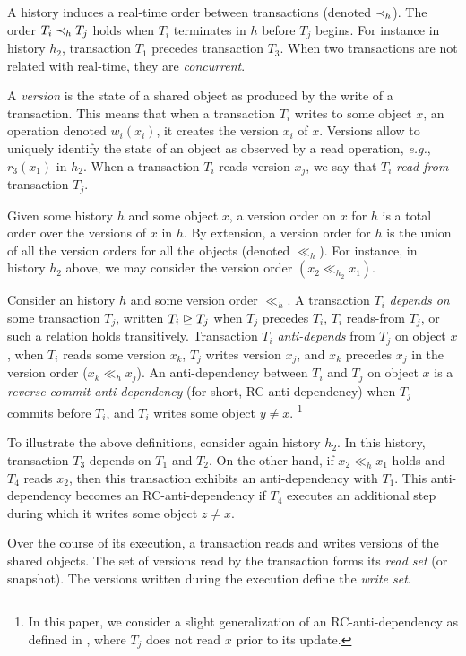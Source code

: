

A history induces a real-time order between transactions (denoted $\hb_h$).
The order $T_i \hb_h T_j$ holds when $T_i$ terminates in $h$ before $T_j$ begins.
For instance in history $h_2$, transaction $T_1$ precedes transaction $T_3$.
When two transactions are not related with real-time, they are \emph{concurrent}.

A \emph{version} is the state of a shared object as produced by the write of a transaction.
This means that when a transaction $T_i$ writes to some object $x$, an operation denoted $w_i(x_i)$, it creates the version $x_i$ of $x$.
Versions allow to uniquely identify the state of an object as observed by a read operation, \emph{e.g.}, $r_3(x_1)$ in $h_2$.
When a transaction $T_i$ reads version $x_j$, we say that $T_i$ \emph{read-from} transaction $T_j$.

Given some history $h$ and some object $x$, a version order on $x$ for $h$ is a total order over the versions of $x$ in $h$.
By extension, a version order for $h$ is the union of all the version orders for all the objects (denoted $\ll_h$).
For instance, in history $h_2$ above, we may consider the version order $(x_2 \ll_{h_2} x_1)$.

Consider an history $h$ and some version order $\ll_h$.
A transaction $T_i$ \emph{depends on} some transaction $T_j$, written $T_i \mathrel{\unrhd} T_j$ when $T_j$ precedes $T_i$, $T_i$ reads-from $T_j$, or such a relation holds transitively.
Transaction $T_i$ \emph{anti-depends} from $T_j$ on object $x$, when $T_i$ reads some version $x_k$, $T_j$ writes version $x_j$, and $x_k$ precedes $x_j$ in the version order ($x_k \ll_{h} x_j$).
An anti-dependency between $T_i$ and $T_j$ on object $x$ is a \emph{reverse-commit anti-dependency} (for short, RC-anti-dependency) \cite{hans16} when $T_j$ commits before $T_i$, and $T_i$ writes some object $y \neq x$.%
%
\footnote{
  In this paper, we consider a slight generalization of an RC-anti-dependency as defined in \cite{hans16}, where $T_j$ does not read $x$ prior to its update.
}

To illustrate the above definitions, consider again history $h_2$.
In this history, transaction $T_3$ depends on $T_1$ and $T_2$.
On the other hand, if $x_2 \ll_h x_1$ holds and $T_4$ reads $x_2$, then this transaction exhibits an anti-dependency with $T_1$.
This anti-dependency becomes an RC-anti-dependency if $T_4$ executes an additional step during which it writes some object $z \neq x$.

Over the course of its execution, a transaction reads and writes versions of the shared objects.
The set of versions read by the transaction forms its \emph{read set} (or snapshot).
The versions written during the execution define the \emph{write set}.

